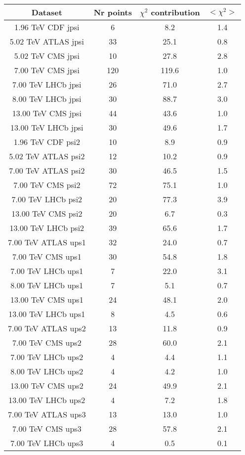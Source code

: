 \begin{table}[h!]
\centering
\begin{tabular}{c|c|c|c}
Dataset & Nr points & $\chi^2$ contribution & $<\chi^2>$ \\
\hline
1.96 TeV CDF jpsi & 6 & 8.2 & 1.4 \\
5.02 TeV ATLAS jpsi & 33 & 25.1 & 0.8 \\
5.02 TeV CMS jpsi & 10 & 27.8 & 2.8 \\
7.00 TeV CMS jpsi & 120 & 119.6 & 1.0 \\
7.00 TeV LHCb jpsi & 26 & 71.0 & 2.7 \\
8.00 TeV LHCb jpsi & 30 & 88.7 & 3.0 \\
13.00 TeV CMS jpsi & 44 & 43.6 & 1.0 \\
13.00 TeV LHCb jpsi & 30 & 49.6 & 1.7 \\
1.96 TeV CDF psi2 & 10 & 8.9 & 0.9 \\
5.02 TeV ATLAS psi2 & 12 & 10.2 & 0.9 \\
7.00 TeV ATLAS psi2 & 30 & 46.5 & 1.5 \\
7.00 TeV CMS psi2 & 72 & 75.1 & 1.0 \\
7.00 TeV LHCb psi2 & 20 & 77.3 & 3.9 \\
13.00 TeV CMS psi2 & 20 & 6.7 & 0.3 \\
13.00 TeV LHCb psi2 & 39 & 65.6 & 1.7 \\
7.00 TeV ATLAS ups1 & 32 & 24.0 & 0.7 \\
7.00 TeV CMS ups1 & 30 & 54.8 & 1.8 \\
7.00 TeV LHCb ups1 & 7 & 22.0 & 3.1 \\
8.00 TeV LHCb ups1 & 7 & 5.1 & 0.7 \\
13.00 TeV CMS ups1 & 24 & 48.1 & 2.0 \\
13.00 TeV LHCb ups1 & 8 & 4.5 & 0.6 \\
7.00 TeV ATLAS ups2 & 13 & 11.8 & 0.9 \\
7.00 TeV CMS ups2 & 28 & 60.0 & 2.1 \\
7.00 TeV LHCb ups2 & 4 & 4.4 & 1.1 \\
8.00 TeV LHCb ups2 & 4 & 4.2 & 1.0 \\
13.00 TeV CMS ups2 & 24 & 49.9 & 2.1 \\
13.00 TeV LHCb ups2 & 4 & 7.2 & 1.8 \\
7.00 TeV ATLAS ups3 & 13 & 13.0 & 1.0 \\
7.00 TeV CMS ups3 & 28 & 57.8 & 2.1 \\
7.00 TeV LHCb ups3 & 4 & 0.5 & 0.1 \\

\end{tabular}
\end{table}
